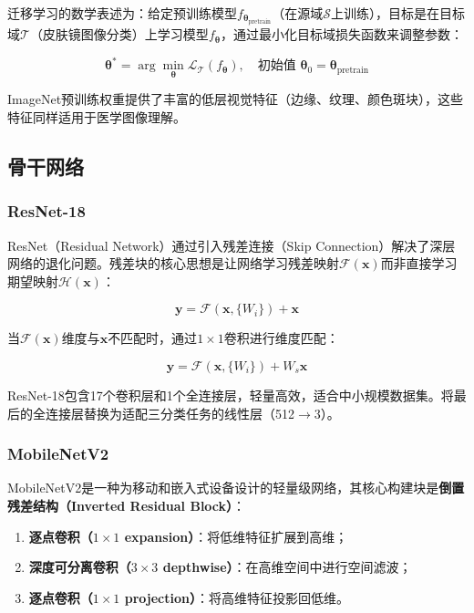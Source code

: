 \documentclass[UTF8,a4paper,12pt]{ctexart}
\numberwithin{figure}{section}
\numberwithin{table}{section}
\begin{document}
迁移学习的数学表述为：给定预训练模型$f_{\boldsymbol{\theta}_{\text{pretrain}}}$（在源域$\mathcal{S}$上训练），目标是在目标域$\mathcal{T}$（皮肤镜图像分类）上学习模型$f_{\boldsymbol{\theta}}$，通过最小化目标域损失函数来调整参数：

\begin{equation}
\boldsymbol{\theta}^* = \arg\min_{\boldsymbol{\theta}} \mathcal{L}_{\mathcal{T}}(f_{\boldsymbol{\theta}}), \quad \text{初始值 } \boldsymbol{\theta}_0 = \boldsymbol{\theta}_{\text{pretrain}}
\end{equation}

ImageNet预训练权重提供了丰富的低层视觉特征（边缘、纹理、颜色斑块），这些特征同样适用于医学图像理解。

\subsection{骨干网络}

\subsubsection{ResNet-18}

ResNet（Residual Network）通过引入残差连接（Skip Connection）解决了深层网络的退化问题。残差块的核心思想是让网络学习残差映射$\mathcal{F}(\mathbf{x})$而非直接学习期望映射$\mathcal{H}(\mathbf{x})$：

\begin{equation}
\mathbf{y} = \mathcal{F}(\mathbf{x}, \{W_i\}) + \mathbf{x}
\end{equation}

当$\mathcal{F}(\mathbf{x})$维度与$\mathbf{x}$不匹配时，通过$1 \times 1$卷积进行维度匹配：

\begin{equation}
\mathbf{y} = \mathcal{F}(\mathbf{x}, \{W_i\}) + W_s \mathbf{x}
\end{equation}

ResNet-18包含17个卷积层和1个全连接层，轻量高效，适合中小规模数据集。将最后的全连接层替换为适配三分类任务的线性层（512$\rightarrow$3）。

\subsubsection{MobileNetV2}

MobileNetV2是一种为移动和嵌入式设备设计的轻量级网络，其核心构建块是\textbf{倒置残差结构（Inverted Residual Block）}：

\begin{enumerate}
    \item \textbf{逐点卷积（$1 \times 1$ expansion）}：将低维特征扩展到高维；
    \item \textbf{深度可分离卷积（$3 \times 3$ depthwise）}：在高维空间中进行空间滤波；
    \item \textbf{逐点卷积（$1 \times 1$ projection）}：将高维特征投影回低维。
\end{enumerate}
\end{document}
